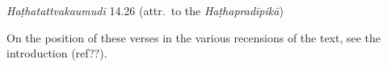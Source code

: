 \begin{ekdosis}
\begin{testimonia}[hp04_009]
\emph{Haṭhatattvakaumudī} 14.26 (attr.~to the \emph{Haṭhapradīpikā})
\begin{versinnote}
\end{versinnote}

\end{testimonia}

\begin{philcomm}[hp04_009]


On the position of these verses in the various recensions of the text, see the introduction (ref??).\lb



\end{philcomm}
\end{ekdosis}
